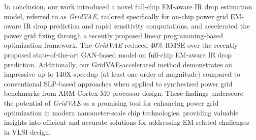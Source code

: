 \documentclass[journal]{IEEEtran}
\begin{document}
In conclusion, our work introduced a novel full-chip EM-aware IR drop estimation model, referred to as {\it GridVAE},  tailored specifically for on-chip power grid EM-aware IR drop prediction and rapid sensitivity computations, and accelerated the power grid fixing through a recently proposed linear programming-based optimization framework. 
The  {\it GridVAE} reduced 40\% RMSE over the recently proposed state-of-the-art GAN-based model on full-chip EM-aware IR drop prediction. 
Additionally, our GridVAE-accelerated method demonstrates an impressive up to 140X speedup (at least one order of
magnitude) compared to conventional SLP-based approaches when applied
to synthesized power grid benchmarks from ARM Cortex-M0 processor
design. These findings underscore the potential of {\it GridVAE} as a
promising tool for enhancing power grid optimization in modern
nanometer-scale chip technologies, providing valuable insights into
efficient and accurate solutions for addressing EM-related challenges
in VLSI design.



%
%
\end{document}
